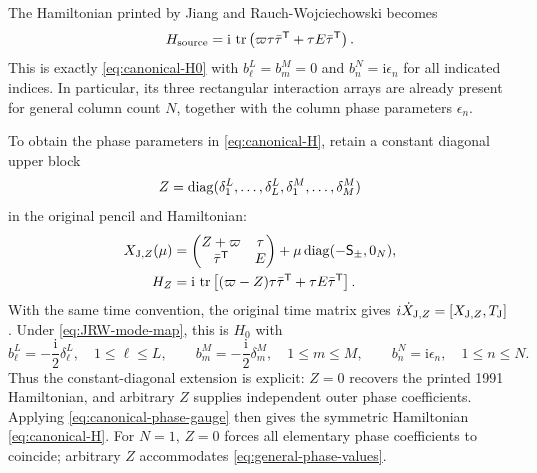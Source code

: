The Hamiltonian printed by Jiang and Rauch-Wojciechowski becomes
\begin{equation}\label{eq:JRW-H}
 H_{\mathrm{source}}=\mathrm i\,\operatorname{tr}
 \left(\varpi\tau\bar{\tau}^{\mathsf T}+\tau E\bar{\tau}^{\mathsf T}\right).
\end{equation}
This is exactly \cref{eq:canonical-H0} with
$b_\ell^L=b_m^M=0$ and $b_n^N=\mathrm i\epsilon_n$ for all indicated
indices. In particular, its three rectangular interaction arrays are
already present for general column count $N$, together with the
column phase parameters $\epsilon_n$.

To obtain the phase parameters in \cref{eq:canonical-H}, retain a
constant diagonal upper block
\begin{equation}\label{eq:JRW-Z}
 Z=\operatorname{diag}(\delta_1^L,\ldots,\delta_L^L,
         \delta_1^M,\ldots,\delta_M^M)
\end{equation}
in the original pencil and Hamiltonian:
\begin{equation}\label{eq:JRW-extension}
\begin{aligned}
 X_{{\rm J},Z}(\mu)
 &=\begin{pmatrix}Z+\varpi&\tau\\\bar{\tau}^{\mathsf T}&E\end{pmatrix}
   +\mu\operatorname{diag}(-\mathsf S_{\pm},0_N),\\
 H_Z&=\mathrm i\,\operatorname{tr}\left[
       (\varpi-Z)\tau\bar{\tau}^{\mathsf T}+\tau E\bar{\tau}^{\mathsf T}\right].
\end{aligned}
\end{equation}
With the same time convention, the original time matrix gives $i\dot X_{{\rm J},Z}=[X_{{\rm J},Z},T_{\rm J}]$. Under
\cref{eq:JRW-mode-map}, this is $H_0$ with
\begin{equation}\label{eq:JRW-phase-map}
 b_\ell^L=-\frac{\mathrm i}{2}\delta_\ell^L,\quad1\leq\ell\leq L,
 \qquad b_m^M=-\frac{\mathrm i}{2}\delta_m^M,\quad1\leq m\leq M,
 \qquad b_n^N=\mathrm i\epsilon_n,\quad1\leq n\leq N.
\end{equation}
Thus the constant-diagonal extension is explicit: $Z=0$ recovers the
printed 1991 Hamiltonian, and arbitrary $Z$ supplies independent
outer phase coefficients. Applying \cref{eq:canonical-phase-gauge}
then gives the symmetric Hamiltonian \cref{eq:canonical-H}.
For $N=1$, $Z=0$ forces all elementary phase coefficients to
coincide; arbitrary $Z$ accommodates \cref{eq:general-phase-values}.


